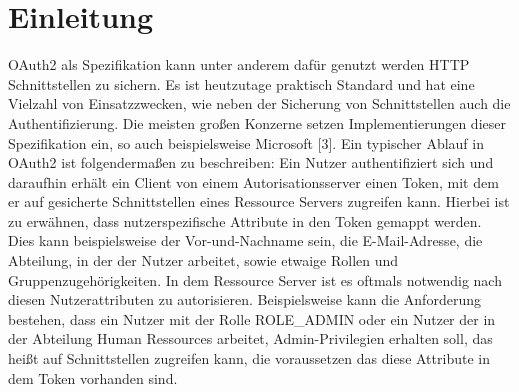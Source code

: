 \chapter{Einleitung}
\label{ch:intro}
OAuth2 als Spezifikation kann unter anderem dafür genutzt werden \ac{HTTP} Schnittstellen zu sichern. Es ist heutzutage praktisch Standard und hat eine Vielzahl von Einsatzzwecken, wie neben der Sicherung von Schnittstellen auch die Authentifizierung. Die meisten großen Konzerne setzen Implementierungen dieser Spezifikation ein, so auch beispielsweise Microsoft [3]. Ein typischer Ablauf in OAuth2 ist folgendermaßen zu beschreiben: Ein Nutzer authentifiziert sich und daraufhin erhält ein Client von einem Autorisationsserver einen Token, mit dem er auf gesicherte Schnittstellen eines Ressource Servers zugreifen kann. Hierbei ist zu erwähnen, dass nutzerspezifische Attribute in den Token gemappt werden. Dies kann beispielsweise der Vor-und-Nachname sein, die E-Mail-Adresse, die Abteilung, in der der Nutzer arbeitet, sowie etwaige Rollen und Gruppenzugehörigkeiten. In dem Ressource Server ist es oftmals notwendig nach diesen Nutzerattributen zu autorisieren. Beispielsweise kann die Anforderung bestehen, dass ein Nutzer mit der Rolle ROLE\_ADMIN oder ein Nutzer der in der Abteilung Human Ressources arbeitet, Admin-Privilegien erhalten soll, das heißt auf Schnittstellen zugreifen kann, die voraussetzen das diese Attribute in dem Token vorhanden sind.\smallskip

